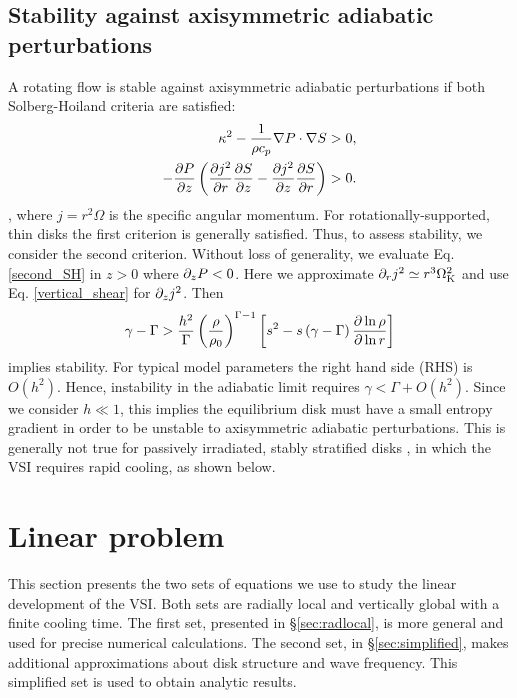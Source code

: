 \subsection{Stability against axisymmetric adiabatic
  perturbations}\label{solberg}
A rotating flow is stable against axisymmetric adiabatic perturbations
if both Solberg-Hoiland criteria  are satisfied:
\begin{align}
  \kappa^2 - \frac{1}{\rho c_p}\nabla P \cdot \nabla S &> 0,\\
  -\frac{\partial P}{\partial z}\left(\frac{\partial j^2}{\partial r}\frac{\partial S}{ \partial z} -
    \frac{\partial j^2}{\partial z}\frac{\partial S}{\partial r} \right)&>0. \label{second_SH} 
\end{align}
\citep{tassoul78}, where $j=r^2\Omega$ is the specific angular
momentum. For rotationally-supported, thin disks %
the first criterion is generally satisfied. 
Thus, to assess stability, we consider the second
criterion. 
Without loss of generality, we evaluate Eq. \ref{second_SH} in $z>0$
where $\partial_zP<0$. Here we approximate $\partial_r j^2\simeq r^3\Omega_{\rm K}^2$ and
use Eq. \ref{vertical_shear} for $\partial_zj^2$. Then 
\begin{align}\label{solberg2}
  \gamma - \Gamma > \frac{ h^2}{\Gamma}
  \left(\frac{\rho}{\rho_0}\right)^{\Gamma-1} \left[s^2
    -s\left(\gamma-\Gamma\right)\frac{\partial\ln{\rho}}{\partial\ln{r}} \right]
\end{align} 
implies stability. For typical model parameters the right hand
side (RHS) is $O( h^2)$. Hence, instability in the adiabatic limit  
requires $\gamma < \Gamma + O( h^2)$. Since we consider
$ h\ll1$, this implies the equilibrium disk must have a small
entropy gradient in order to be unstable to axisymmetric adiabatic
perturbations. This is generally not true for passively irradiated, stably
stratified disks \citep{chiang97}, in which the VSI requires rapid
cooling, as shown below. 

\section{Linear problem}\label{linear} 
This section presents the two sets of equations we use to study the
linear development of the VSI.  Both sets are radially local and vertically global 
with a finite cooling time.
The first set, presented in \S\ref{sec:radlocal}, is more general and used 
for precise numerical calculations.  The second set, in \S\ref{sec:simplified}, makes
additional approximations  about disk structure and wave frequency.  This simplified
set is used to obtain analytic results.


